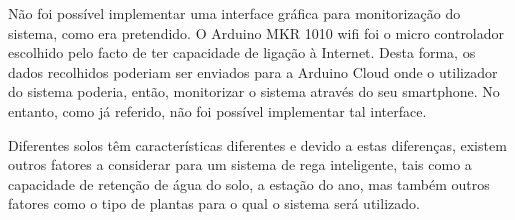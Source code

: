 \documentclass[conference]{IEEEtran}
\begin{document}
Não foi possível implementar uma interface gráfica para monitorização do sistema, como era pretendido.
O Arduino MKR 1010 wifi foi o micro controlador escolhido pelo facto de ter capacidade de ligação à Internet.
Desta forma, os dados recolhidos poderiam ser enviados para a Arduino Cloud onde o utilizador do sistema poderia,
então, monitorizar o sistema através do seu smartphone. No entanto, como já referido, não foi possível
implementar tal interface.

Diferentes solos têm características diferentes e devido a estas diferenças, existem outros
fatores a considerar para um sistema de rega inteligente, tais como a capacidade de retenção de água do solo,
a estação do ano, mas também outros fatores como o tipo de plantas para o qual o sistema será utilizado.



\end{document}

